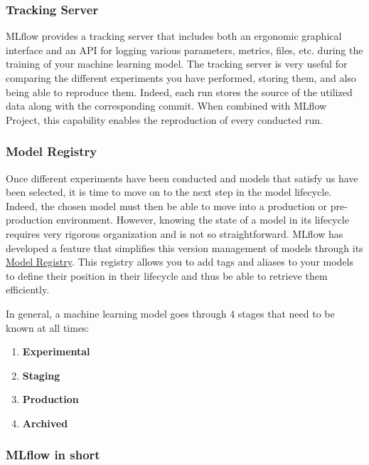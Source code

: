 
\subsubsection{Tracking Server}

MLflow provides a tracking server that includes both an ergonomic graphical interface and an API for logging various parameters, metrics, files, etc. during the training of your machine learning model. The tracking server is very useful for comparing the different experiments you have performed, storing them, and also being able to reproduce them. Indeed, each run stores the source of the utilized data along with the corresponding commit. When combined with MLflow Project, this capability enables the reproduction of every conducted run.


\subsubsection{Model Registry}

Once different experiments have been conducted and models that satisfy us have been selected, it is time to move on to the next step in the model lifecycle. Indeed, the chosen model must then be able to move into a production or pre-production environment. However, knowing the state of a model in its lifecycle requires very rigorous organization and is not so straightforward. MLflow has developed a feature that simplifies this version management of models through its \href{https://MLflow.org/docs/latest/model-registry.html}{Model Registry}. This registry allows you to add tags and aliases to your models to define their position in their lifecycle and thus be able to retrieve them efficiently.

In general, a machine learning model goes through 4 stages that need to be known at all times:

\begin{enumerate}
    \item \textbf{Experimental}
    \item \textbf{Staging}
    \item \textbf{Production}
    \item \textbf{Archived}
\end{enumerate}


\subsubsection{MLflow in short}

